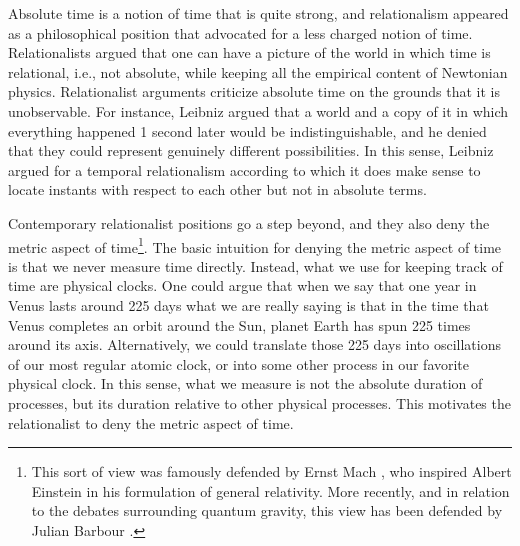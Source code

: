 \documentclass[12 pt]{article}
\begin{document}
Absolute time is a notion of time that is quite strong, and relationalism appeared as a philosophical position that advocated for a less charged notion of time. Relationalists argued that one can have a picture of the world in which time is relational, i.e., not absolute, while keeping all the empirical content of Newtonian physics. Relationalist arguments criticize absolute time on the grounds that it is unobservable. For instance, Leibniz argued that a world and a copy of it in which everything happened 1 second later would be indistinguishable, and he denied that they could represent genuinely different possibilities. In this sense, Leibniz argued for a temporal relationalism according to which it does make sense to locate instants with respect to each other but not in absolute terms.

Contemporary relationalist positions go a step beyond, and they also deny the metric aspect of time\footnote{This sort of view was famously defended by Ernst Mach \citep{Mach1883}, who inspired Albert Einstein in his formulation of general relativity. More recently, and in relation to the debates surrounding quantum gravity, this view has been defended by Julian Barbour \citep{Barbour1994}.}. The basic intuition for denying the metric aspect of time is that we never measure time directly. Instead, what we use for keeping track of time are physical clocks. One could argue that when we say that one year in Venus lasts around 225 days what we are really saying is that in the time that Venus completes an orbit around the Sun, planet Earth has spun 225 times around its axis. Alternatively, we could translate those 225 days into oscillations of our most regular atomic clock, or into some other process in our favorite physical clock. In this sense, what we measure is not the absolute duration of processes, but its duration relative to other physical processes. This motivates the relationalist to deny the metric aspect of time.
\end{document}
